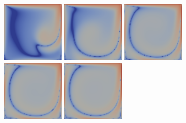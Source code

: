 \documentclass[english, nochinese]{pkupaper}
\begin{document}
\begin{figure}[htbp]
{{
\includegraphics[width=3cm]{Results/Figure02k.pdf}
\includegraphics[width=3cm]{Results/Figure02l.pdf}
\includegraphics[width=3cm]{Results/Figure02m.pdf}
\includegraphics[width=3cm]{Results/Figure02n.pdf}
\includegraphics[width=3cm]{Results/Figure02o.pdf}
}

}
\end{figure}
\end{document}
